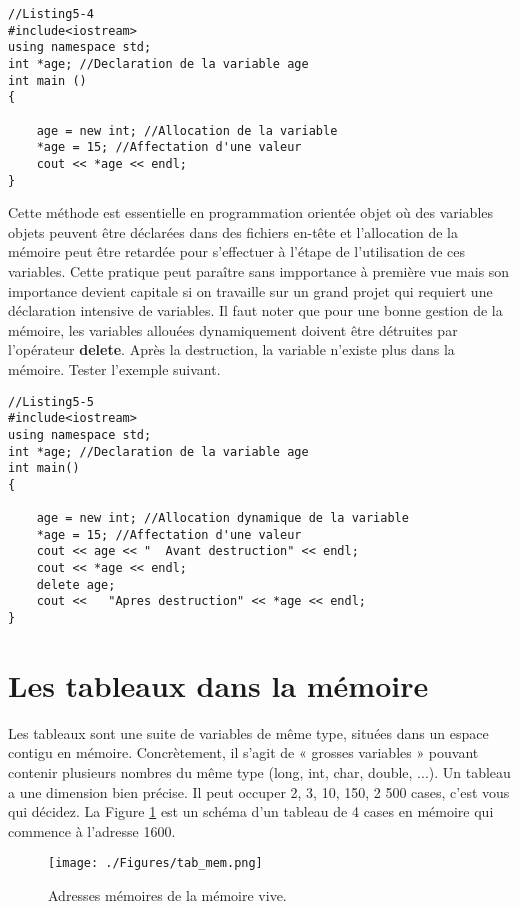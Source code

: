 \documentclass[a4paper, oneside,11pt]{book}
\begin{document}
\begin{lstlisting}
//Listing5-4
#include<iostream>
using namespace std;
int *age; //Declaration de la variable age
int main ()
{
    
    age = new int; //Allocation de la variable
    *age = 15; //Affectation d'une valeur
    cout << *age << endl;
}
\end{lstlisting}

Cette m\'ethode est essentielle en programmation orient\'ee objet o\`u des   variables objets peuvent \^etre d\'eclar\'ees dans des fichiers en-t\^ete et l'allocation de la m\'emoire
peut \^etre retard\'ee pour s'effectuer \`a l'\'etape de l'utilisation de ces variables. Cette pratique peut para\^itre sans impportance \`a premi\`ere vue mais son importance devient 
capitale si on travaille sur un grand projet qui requiert une d\'eclaration intensive de variables. Il faut noter que pour une bonne gestion de la m\'emoire, les variables allou\'ees
dynamiquement doivent \^etre d\'etruites par l'op\'erateur \textbf{delete}. Apr\`es la destruction, la variable n'existe plus dans la m\'emoire. Tester l'exemple suivant.

\begin{lstlisting}
//Listing5-5
#include<iostream>
using namespace std;
int *age; //Declaration de la variable age
int main()
{
    
    age = new int; //Allocation dynamique de la variable
    *age = 15; //Affectation d'une valeur
    cout << age << "  Avant destruction" << endl;
    cout << *age << endl;
    delete age;
    cout <<   "Apres destruction" << *age << endl;
}
\end{lstlisting}




\section{Les tableaux dans la m\'emoire}

Les tableaux sont une suite de variables de m\^eme type, situ\'ees dans un espace contigu en m\'emoire. Concr\`etement, il s'agit de « grosses variables » pouvant contenir plusieurs
nombres du m\^eme type (long, int, char, double, ...). Un tableau a une dimension bien pr\'ecise. Il peut occuper 2, 3, 10, 150, 2 500 cases, c'est vous qui d\'ecidez. La Figure \ref{mem}
est un sch\'ema d'un tableau de 4 cases en m\'emoire qui commence \`a l'adresse 1600.

\begin{figure}[hhhh]
\begin{center}
\texttt{[image: ./Figures/tab\_mem.png]}
\end{center}
\vspace{-0.25cm}\caption{Adresses m\'emoires de la m\'emoire vive.}\label{mem}
\end{figure}
\end{document}
